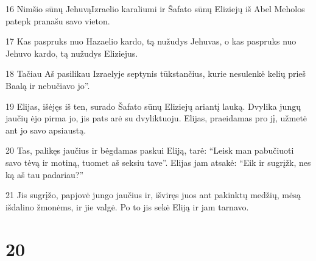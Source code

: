 \par 16 Nimšio sūnų Jehuvą­Izraelio karaliumi ir Šafato sūnų Eliziejų iš Abel Meholos patepk pranašu savo vieton. 
\par 17 Kas paspruks nuo Hazaelio kardo, tą nužudys Jehuvas, o kas paspruks nuo Jehuvo kardo, tą nužudys Eliziejus. 
\par 18 Tačiau Aš pasilikau Izraelyje septynis tūkstančius, kurie nesulenkė kelių prieš Baalą ir nebučiavo jo”. 
\par 19 Elijas, išėjęs iš ten, surado Šafato sūnų Eliziejų ariantį lauką. Dvylika jungų jaučių ėjo pirma jo, jis pats arė su dvyliktuoju. Elijas, praeidamas pro jį, užmetė ant jo savo apsiaustą. 
\par 20 Tas, palikęs jaučius ir bėgdamas paskui Eliją, tarė: “Leisk man pabučiuoti savo tėvą ir motiną, tuomet aš seksiu tave”. Elijas jam atsakė: “Eik ir sugrįžk, nes ką aš tau padariau?” 
\par 21 Jis sugrįžo, papjovė jungo jaučius ir, išviręs juos ant pakinktų medžių, mėsą išdalino žmonėms, ir jie valgė. Po to jis sekė Eliją ir jam tarnavo.



\chapter{20}

